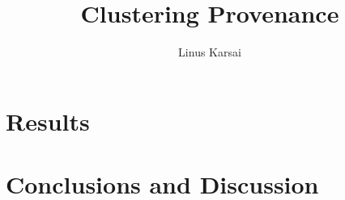 \documentclass[BIT, graphvis, a4paper]{usydthesis}
\title{Clustering Provenance}
\begin{document}
\author{Linus Karsai}

\maketitle
\tableofcontents
\newpage\setcounter{page}{1}








\chapter{Results} %

\chapter{Conclusions and Discussion} %


\printbibliography


\end{document}
